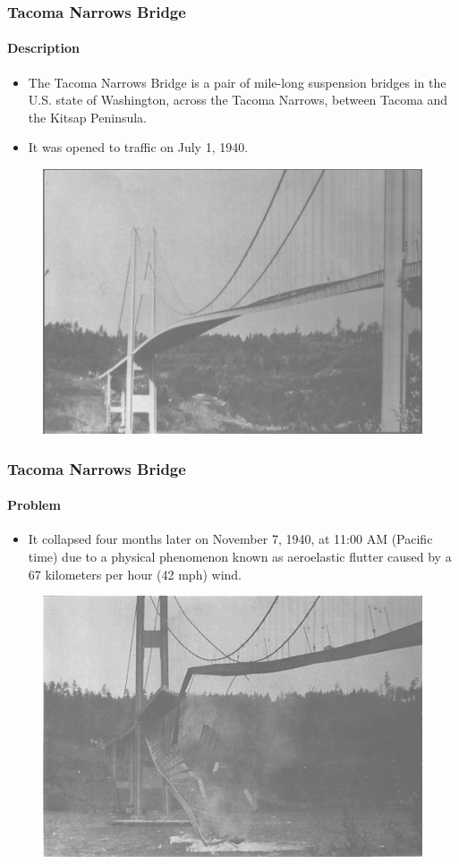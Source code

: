 \begin{frame}[hasprev=false, hasnext=true]
\label{example:tacoma-narrows-bridge}
\frametitle{Tacoma Narrows Bridge}
\framesubtitle{Description}

\begin{itemize}
	\item The Tacoma Narrows Bridge is a pair of mile-long suspension bridges
	in the U.S. state of Washington, across the Tacoma Narrows, between Tacoma
	and the Kitsap Peninsula.

	\item It was opened to traffic on July 1, 1940.
\end{itemize}

\begin{figure}
	\centering
	\includegraphics[width=.5\textwidth]{aux/examples/tacoma-narrows-bridge/tacoma-narrows-bridge}
\end{figure}
\end{frame}



\begin{frame}[hasprev=true, hasnext=true]
\frametitle{Tacoma Narrows Bridge}
\framesubtitle{Problem}

\begin{itemize}
	\item It collapsed four months later on November 7, 1940, at 11:00 AM
	(Pacific time) due to a physical phenomenon known as aeroelastic flutter
	caused by a 67 kilometers per hour (42 mph) wind.
\end{itemize}

\begin{figure}
	\centering
	\includegraphics[width=.6\textwidth]{aux/examples/tacoma-narrows-bridge/tacoma-narrows-bridge-collapsed}
\end{figure}
\end{frame}



